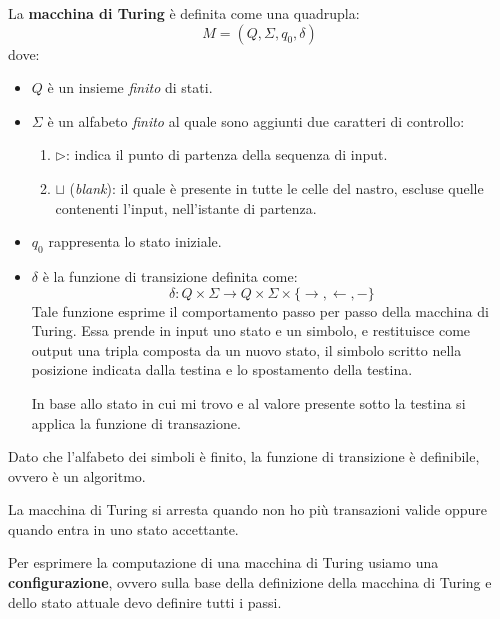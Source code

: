 \begin{definizione}
    La \textbf{macchina di Turing} è definita come una quadrupla:
    \begin{equation}
        M = (Q, \Sigma, q_0, \delta)
    \end{equation}
    dove:
    \begin{itemize}
        \item $Q$ è un insieme \textit{finito} di stati.
        \item $\Sigma$ è un alfabeto \textit{finito} al quale sono aggiunti due
         caratteri di controllo:
        \begin{enumerate}
            \item $\triangleright$: indica il punto di partenza della sequenza di input.
            \item $\sqcup$ (\textit{blank}): il quale è presente in tutte le celle
             del nastro, escluse quelle contenenti l'input, nell'istante di partenza.
        \end{enumerate}
        \item $q_0$ rappresenta lo stato iniziale.
        \item $\delta$ è la funzione di transizione definita come:
        \begin{equation}
            \delta: Q \times \Sigma \longrightarrow Q \times \Sigma \times \{\rightarrow, \leftarrow, -\}
        \end{equation}
        Tale funzione esprime il comportamento passo per passo della macchina di 
        Turing. Essa prende in input uno stato e un simbolo, e restituisce come output
         una tripla composta da un nuovo stato, il simbolo scritto nella posizione
          indicata dalla testina e lo spostamento della testina.

        In base allo stato in cui mi trovo e al valore presente sotto la testina 
        si applica la funzione di transazione.
    \end{itemize}
\end{definizione}
\begin{osservazione}
    Dato che l'alfabeto dei simboli è finito, la funzione di transizione è definibile, 
    ovvero è un algoritmo.
\end{osservazione}

La macchina di Turing si arresta quando non ho più transazioni valide oppure 
quando entra in uno stato accettante. 

Per esprimere la computazione di una macchina di Turing usiamo una \textbf{configurazione}, 
ovvero sulla base della definizione della macchina di Turing e dello stato attuale devo definire tutti i passi. 

